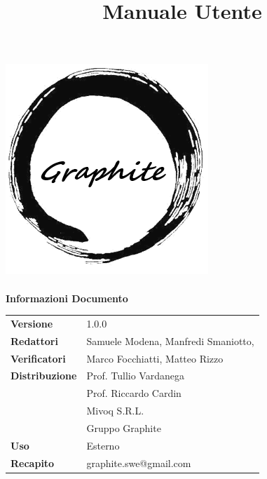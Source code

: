 \documentclass[openany,12pt,a4paper]{report}
\title{Manuale Utente}
\author{}
\newcommand{\versione}{1.0.0}
\begin{document}
	\makeatletter
	\begin{titlepage}
		\setlength{\headsep}{0pt}  
		\begin{center}
			\includegraphics[width=0.5\linewidth]{img/logo.png}\\[1em]
			{\huge \bfseries  \@title }\\[10ex]
			\textbf{\Large Informazioni Documento} \\[2em]
			\bgroup
			\def\arraystretch{1.5}
			\begin{tabular}{l|l}
				\textbf{Versione} & \versione{} \\
				\textbf{Redattori} & Samuele Modena, Manfredi Smaniotto, \\
				\textbf{Verificatori} & Marco Focchiatti, Matteo Rizzo \\
				\textbf{Distribuzione} & Prof. Tullio Vardanega \\
				& Prof. Riccardo Cardin \\
				& Mivoq S.R.L. \\
				& Gruppo Graphite \\
				\textbf{Uso} & Esterno \\
				\textbf{Recapito} & graphite.swe@gmail.com \\
			\end{tabular}
			\egroup
		\end{center}
	\end{titlepage}
	\makeatother
	
	\thispagestyle{empty}
	\newpage
	
	
\end{document}
